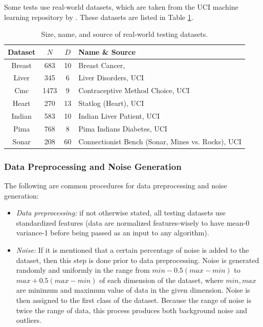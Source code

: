Some tests use real-world datasets, which are taken from the UCI
machine learning repository by \cite{ucidata}. These datasets are
listed in Table \ref{tab:datasets}.

\begin{table}[htbp!]
\centering
\begin{tabular}{c  c c l}
\hline\hline
Dataset & $N$ & $D$ & Name \& Source \\
\hline
Breast & 683 & 10 & Breast Cancer, \cite{breast} \\
Liver & 345 & 6 & Liver Disorders, UCI \\
Cmc & 1473 & 9 & Contraceptive Method Choice, UCI\\
Heart & 270 & 13 & Statlog (Heart), UCI\\
Indian & 583 & 10 & Indian Liver Patient, UCI\\
Pima & 768 & 8 & Pima Indians Diabetes, UCI\\
Sonar & 208 & 60 & Connectionist Bench (Sonar, Mines vs. Rocks), UCI\\
\hline\hline
\end{tabular}
\caption{Size, name, and source of real-world testing datasets.} 
\label{tab:datasets}
\end{table}

\subsubsection{Data Preprocessing and Noise Generation}
The following are common procedures for data preprocessing and noise
generation:
\begin{itemize}
\item \emph{Data preprocessing:} if not otherwise stated, all testing
  datasets use standardized features (data are normalized
  features-wisely to have mean-0 variance-1 before being passed as an
  input to any algorithm).
\item \emph{Noise:} If it is mentioned that a certain percentage of
  noise is added to the dataset, then this step is done prior to data
  preprocessing. Noise is generated randomly and uniformly in the
  range from $min - 0.5(max-min)$ to $max + 0.5(max-min)$ of each
  dimension of the dataset, where $min, max$ are minimum and maximum
  value of data in the given dimension. Noise is then assigned to the
  first class of the dataset. Because the range of noise is twice the
  range of data, this process produces both background noise and
  outliers.
\end{itemize}


